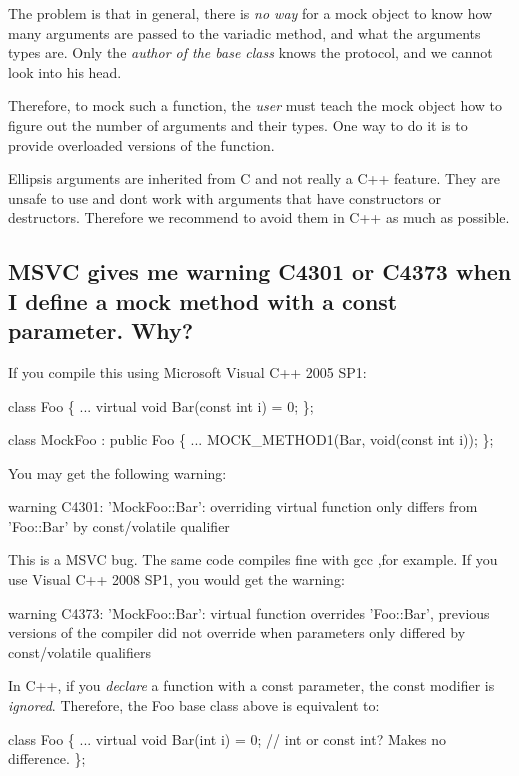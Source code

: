 The problem is that in general, there is {\itshape no way} for a mock object to know how many arguments are passed to the variadic method, and what the arguments\textquotesingle{} types are. Only the {\itshape author of the base class} knows the protocol, and we cannot look into his head.

Therefore, to mock such a function, the {\itshape user} must teach the mock object how to figure out the number of arguments and their types. One way to do it is to provide overloaded versions of the function.

Ellipsis arguments are inherited from C and not really a C++ feature. They are unsafe to use and don\textquotesingle{}t work with arguments that have constructors or destructors. Therefore we recommend to avoid them in C++ as much as possible.

\subsection*{M\+S\+VC gives me warning C4301 or C4373 when I define a mock method with a const parameter. Why?}

If you compile this using Microsoft Visual C++ 2005 S\+P1\+: 
\begin{DoxyCode}
class Foo \{
  ...
  virtual void Bar(const int i) = 0;
\};

class MockFoo : public Foo \{
  ...
  MOCK\_METHOD1(Bar, void(const int i));
\};
\end{DoxyCode}
 You may get the following warning\+: 
\begin{DoxyCode}
warning C4301: 'MockFoo::Bar': overriding virtual function only differs from 'Foo::Bar' by const/volatile
       qualifier
\end{DoxyCode}


This is a M\+S\+VC bug. The same code compiles fine with gcc ,for example. If you use Visual C++ 2008 S\+P1, you would get the warning\+: 
\begin{DoxyCode}
warning C4373: 'MockFoo::Bar': virtual function overrides 'Foo::Bar', previous versions of the compiler did
       not override when parameters only differed by const/volatile qualifiers
\end{DoxyCode}


In C++, if you {\itshape declare} a function with a {\ttfamily const} parameter, the {\ttfamily const} modifier is {\itshape ignored}. Therefore, the {\ttfamily Foo} base class above is equivalent to\+: 
\begin{DoxyCode}
class Foo \{
  ...
  virtual void Bar(int i) = 0;  // int or const int?  Makes no difference.
\};
\end{DoxyCode}


